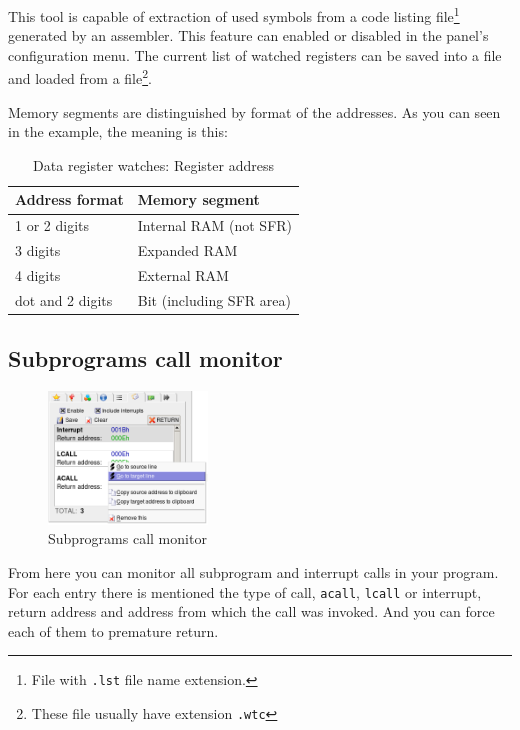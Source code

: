 \documentclass[a4paper,twoside,12pt]{book}
\newcommand{\fileextension}[1]{\texttt{#1}}
\newcommand{\mysmallfont}{\fontsize{8pt}{10pt} \selectfont{}}
\begin{document}
			This tool is capable of extraction of used symbols from a code listing file\footnote{File with \fileextension{.lst} file name extension.} generated by an assembler. This feature can enabled or disabled in the panel's configuration menu. The current list of watched registers can be saved into a file and loaded from a file\footnote{These file usually have extension \fileextension{.wtc}}.

			Memory segments are distinguished by format of the addresses. As you can seen in the example, the meaning is this:
			\begin{table}[h!]
				\mysmallfont{}
				\centering{}
				\begin{tabular}{l|l}
					\textbf{Address format}	& \textbf{Memory segment}	\\
					\hline
					1 or 2 digits		& Internal RAM (not SFR)	\\
					3 digits		& Expanded RAM			\\
					4 digits		& External RAM			\\
					dot and 2 digits	& Bit (including SFR area)	\\
				\end{tabular}
				\caption{Data register watches: Register address}
			\end{table}

		\subsection{Subprograms call monitor}
			\begin{figure}
				\centering{}
				\includegraphics[width=120pt]{img/034.png}
				\caption{Subprograms call monitor}
			\end{figure}
			From here you can monitor all subprogram and interrupt calls in your program. For each entry there is mentioned the type of call, \texttt{acall}, \texttt{lcall} or interrupt, return address and address from which the call was invoked. And you can force each of them to premature return.
\end{document}
